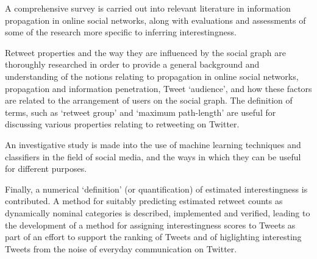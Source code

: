A comprehensive survey is carried out into relevant literature in information propagation in online social networks, along with evaluations and assessments of some of the research more specific to inferring interestingness.

Retweet properties and the way they are influenced by the social graph are thoroughly researched in order to provide a general background and understanding of the notions relating to propagation in online social networks, propagation and information penetration, Tweet `audience', and how these factors are related to the arrangement of users on the social graph. The definition of terms, such as `retweet group' and `maximum path-length' are useful for discussing various properties relating to retweeting on Twitter.

An investigative study is made into the use of machine learning techniques and classifiers in the field of social media, and the ways in which they can be useful for different purposes.

Finally, a numerical `definition' (or quantification) of estimated interestingness is contributed. A method for suitably predicting estimated retweet counts as dynamically nominal categories is described, implemented and verified, leading to the development of a method for assigning interestingness scores to Tweets as part of an effort to support the ranking of Tweets and of higlighting interesting Tweets from the noise of everyday communication on Twitter.
